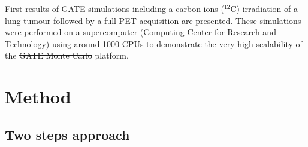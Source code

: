 \documentclass[11pt]{iopart}
\providecommand{\DIFdeltex}[1]{{\protect\color{red}\sout{#1}}}                      %
\providecommand{\DIFaddend}{} %
\providecommand{\DIFdelbegin}{} %
\providecommand{\DIFdelend}{} %
\providecommand{\DIFdel}[1]{\texorpdfstring{\DIFdeltex{#1}}{}} %
\begin{document}
\DIFaddend First results of GATE simulations including a carbon ions ($^{12}$C)
irradiation of a lung tumour followed by a full PET acquisition are
presented. These simulations were performed on a supercomputer
(Computing Center for Research and Technology) using around 1000 CPUs
to demonstrate the \DIFdelbegin \DIFdel{very }\DIFdelend high scalability of the \DIFdelbegin \DIFdel{GATE Monte Carlo }\DIFdelend platform.

\section{Method}



\subsection{Two steps approach}
\end{document}
